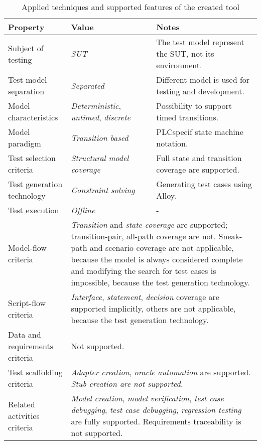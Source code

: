 \begin{table}[htb]
\begin{center}
\begin{tabular}{p{4cm}p{3.5cm}p{6.5cm}}
\toprule
	\textbf{Property} & \textbf{Value} & \textbf{Notes} \\\midrule
	Subject of testing & \textit{SUT} & The test model represent the SUT, not its environment. \\
	Test model separation & \textit{Separated} & Different model is used for testing and development.\\
	Model characteristics & \textit{Deterministic}, \textit{untimed}, \textit{discrete} & Possibility to support timed transitions. \\
	Model paradigm & \textit{Transition based} & PLCspecif state machine notation.\\
	Test selection criteria & \textit{Structural model coverage} & Full state and transition coverage are supported.\\
	Test generation technology & \textit{Constraint solving} & Generating test cases using Alloy. \\
	Test execution & \textit{Offline} & - \\
	Model-flow criteria & \multicolumn{2}{p{10.5cm}}{\textit{Transition} and \textit{state coverage} are supported; transition-pair, all-path coverage are not. Sneak-path and scenario coverage are not applicable, because the model is always considered complete and modifying the search for test cases is impossible, because the test generation technology.} \\
	Script-flow criteria & \multicolumn{2}{p{10.5cm}}{\textit{Interface}, \textit{statement}, \textit{decision} coverage are supported implicitly, others are not applicable, because the test generation technology.} \\
	Data and requirements criteria & \multicolumn{2}{p{10.5cm}}{Not supported.} \\
	Test scaffolding criteria & \multicolumn{2}{p{10.5cm}}{\textit{Adapter creation}, \textit{oracle automation} are supported. \textit{Stub creation are not supported.}} \\
	Related activities criteria & \multicolumn{2}{p{10.5cm}}{\textit{Model creation}, \textit{model verification}, \textit{test case debugging}, \textit{test case debugging}, \textit{regression testing} are fully supported. Requirements traceability is not supported.} \\
\bottomrule
\end{tabular}
\end{center}
\caption{\label{tab:toolevaluation} Applied techniques and supported features of the created tool}
\end{table}

